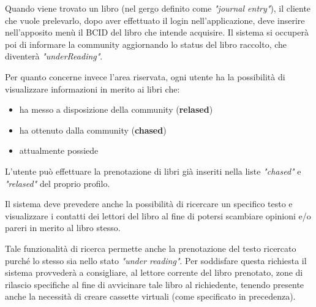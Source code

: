 Quando viene trovato un libro (nel gergo definito come \textit{"journal entry"}), il cliente che vuole prelevarlo, dopo
aver effettuato il login nell'applicazione, deve inserire nell'apposito menù il BCID del libro che intende acquisire.
Il sistema si occuperà poi di informare la community aggiornando lo status del libro raccolto, che diventerà \textit{"underReading"}.

Per quanto concerne invece l'area riservata, ogni utente ha la possibilità di 
visualizzare informazioni in merito ai libri che: 
\begin{itemize}
	\item ha messo a disposizione della community (\textbf{relased})
	\item ha ottenuto dalla community (\textbf{chased})
	\item attualmente possiede
\end{itemize}

L'utente può effettuare la prenotazione di libri già inseriti nella liste \textit{"chased"} e \textit{"relased"} del proprio profilo.


Il sistema deve prevedere anche la possibilità di ricercare un specifico testo e visualizzare i contatti dei
lettori del libro al fine di potersi scambiare opinioni e/o pareri in merito al libro stesso.

Tale funzionalità di ricerca permette anche la prenotazione del testo ricercato purché lo stesso sia nello
stato \textit{"under reading"}.
Per soddisfare questa richiesta il sistema provvederà a consigliare, al lettore corrente 
del libro prenotato, zone di rilascio specifiche al fine di avvicinare tale libro al richiedente, tenendo presente anche la necessità di creare cassette virtuali (come specificato in precedenza).